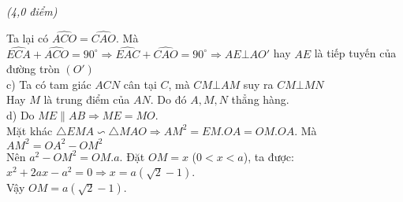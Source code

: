 \begin{ex}{\it{(4,0 điểm)}}
{{
}
Ta lại có $\widehat{ACO}=\widehat{CAO}$. Mà $\widehat{ECA}+\widehat{ACO}=90^{\circ}\Longrightarrow \widehat{EAC}+\widehat{CAO}=90^{\circ} \Longrightarrow AE\bot AO'$ hay $ AE $ là tiếp tuyến của đường tròn $(O')$\\
c) Ta có tam giác $ACN$ cân tại $C$, mà $CM\bot AM$ suy ra $CM\bot MN$\\
Hay $M$ là trung điểm của $AN$. Do đó $A,M,N$ thẳng hàng.\\
d) Do $ME \parallel AB\Longrightarrow ME=MO $.\\
Mặt khác $\triangle EMA \backsim \triangle MAO\Longrightarrow AM^2=EM.OA=OM.OA$. Mà $AM^2=OA^2-OM^2$\\
Nên $a^2-OM^2=OM.a$. Đặt $OM=x$ ($0<x<a$), ta được: $x^2+2ax-a^2=0\Longrightarrow x=a(\sqrt{2}-1)$.\\
Vậy $OM=a(\sqrt{2}-1)$.
}
\end{ex}

